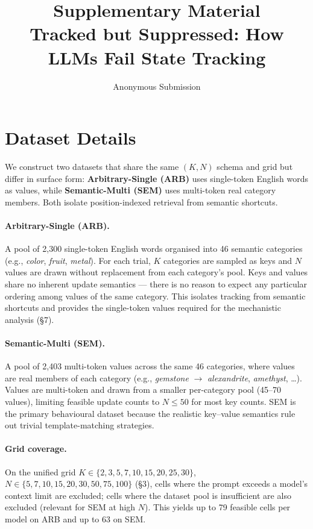 \documentclass[letterpaper]{article} %
\title{Supplementary Material\\Tracked but Suppressed: How LLMs Fail State Tracking}
\author{Anonymous Submission}
\begin{document}
\maketitle

\appendix

\section{Dataset Details}
\label{app:datasets}

We construct two datasets that share the same $(K, N)$ schema and
grid but differ in surface form: \textbf{Arbitrary-Single (ARB)} uses
single-token English words as values, while \textbf{Semantic-Multi
(SEM)} uses multi-token real category members. Both isolate
position-indexed retrieval from semantic shortcuts.

\paragraph{Arbitrary-Single (ARB).}
A pool of 2{,}300 single-token English words organised into 46
semantic categories (e.g., \textit{color}, \textit{fruit},
\textit{metal}).
For each trial, $K$ categories are sampled as keys and $N$ values are
drawn without replacement from each category's pool.
Keys and values share no inherent update semantics --- there is no
reason to expect any particular ordering among values of the same
category.
This isolates tracking from semantic shortcuts and provides the
single-token values required for the mechanistic analysis
(\S7).

\paragraph{Semantic-Multi (SEM).}
A pool of 2{,}403 multi-token values across the same 46 categories,
where values are real members of each category (e.g., \textit{gemstone}
$\rightarrow$ \textit{alexandrite}, \textit{amethyst}, \ldots).
Values are multi-token and drawn from a smaller per-category pool
(45--70 values), limiting feasible update counts to $N \leq 50$ for
most key counts.
SEM is the primary behavioural dataset because the realistic
key--value semantics rule out trivial template-matching strategies.

\paragraph{Grid coverage.}
On the unified grid $K \in \{2, 3, 5, 7, 10, 15, 20, 25, 30\}$,
$N \in \{5, 7, 10, 15, 20, 30, 50, 75, 100\}$ (\S3),
cells where the prompt exceeds a model's context limit are excluded;
cells where the dataset pool is insufficient are also excluded
(relevant for SEM at high $N$).
This yields up to 79 feasible cells per model on ARB and up to 63
on SEM.
\end{document}

